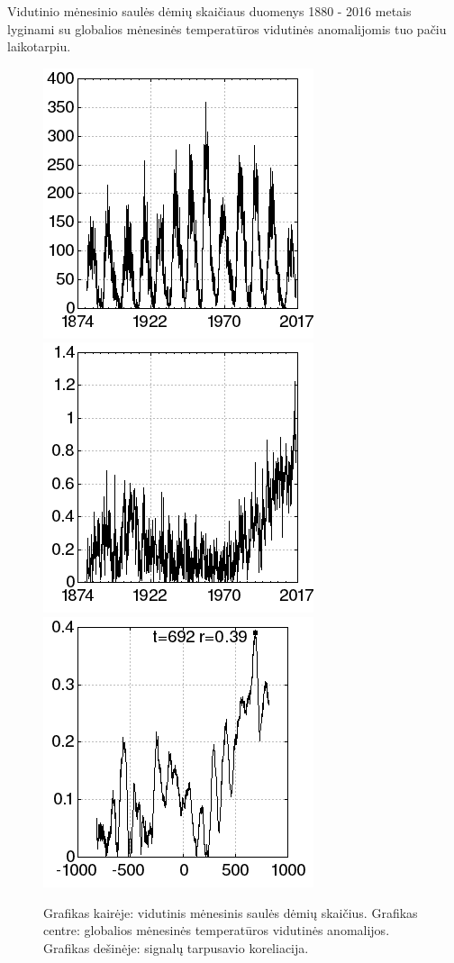 Vidutinio mėnesinio saulės dėmių skaičiaus duomenys\cite{sunspots} 1880 - 2016 metais lyginami su
globalios mėnesinės temperatūros vidutinės anomalijomis\cite{temp} tuo pačiu laikotarpiu.

\begin{figure}
\includegraphics[scale=0.65]{../scripts/sunspots_temperature/sunspots.png}
\includegraphics[scale=0.65]{../scripts/sunspots_temperature/temp.png}
\includegraphics[scale=0.65]{../scripts/sunspots_temperature/result.png}
\caption{Grafikas kairėje: vidutinis mėnesinis saulės dėmių skaičius. Grafikas centre: globalios mėnesinės temperatūros vidutinės anomalijos. Grafikas dešinėje: signalų tarpusavio koreliacija.}
\end{figure}

